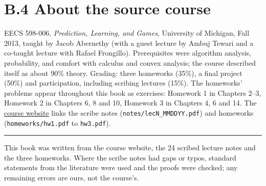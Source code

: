 \documentclass[11pt,a4paper,openany]{book}
\newenvironment{marginnote}{\par\medskip\noindent\color{muted}\small\sffamily\rule{\linewidth}{0.4pt}\par}{\par\medskip}
\begin{document}
\section*{B.4 About the source course}\label{appB-course}

EECS 598-006, \emph{Prediction, Learning, and Games}, University of Michigan, Fall 2013, taught by Jacob Abernethy (with a guest lecture by Ambuj Tewari and a co-taught lecture with Rafael Frongillo). Prerequisites were algorithm analysis, probability, and comfort with calculus and convex analysis; the course described itself as about 90\% theory. Grading: three homeworks (35\%), a final project (50\%) and participation, including scribing lectures (15\%). The homeworks' problems appear throughout this book as exercises: Homework 1 in Chapters 2–3, Homework 2 in Chapters 6, 8 and 10, Homework 3 in Chapters 4, 6 and 14. The \href{https://web.eecs.umich.edu/~jabernet/eecs598course/fall2013/web/}{course website} links the scribe notes (\texttt{notes/lecN\_MMDDYY.pdf}) and homeworks (\texttt{homeworks/hw1.pdf} to \texttt{hw3.pdf}).

\begin{marginnote}
This book was written from the course website, the 24 scribed lecture notes and the three homeworks. Where the scribe notes had gaps or typos, standard statements from the literature were used and the proofs were checked; any remaining errors are ours, not the course's.
\end{marginnote}

\backmatter
{}
\end{document}
